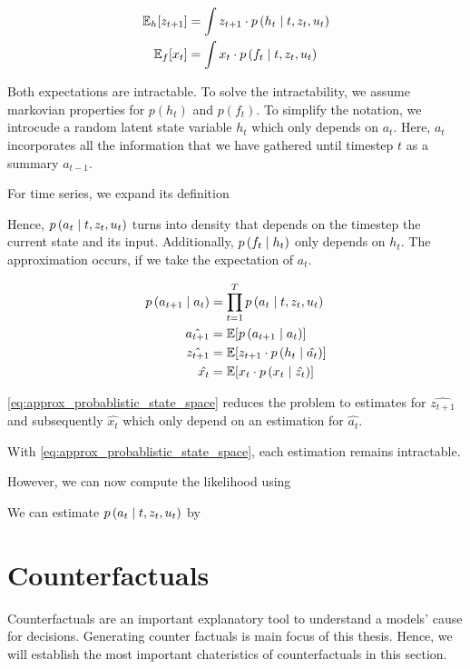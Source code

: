 \documentclass[12pt,a4paper]{report}
\begin{document}
\begin{align}
    \label{eq:probablistic_state_space}
    \mathbb{E}_h[z_{t+1}] & =
    \int z_{t+1} \cdot p\left(h_t \mid t, z_{t}, u_{t}\right) \\
    \mathbb{E}_f[x_{t}]   & =
    \int x_{t} \cdot p\left(f_t \mid t, z_{t}, u_{t}\right) \nonumber
\end{align}

\noindent Both expectations are intractable. To solve the intractability, we assume markovian properties for $p(h_t)$ and $p(f_t)$. To simplify the notation, we introcude a random latent state variable $h_t$ which only depends on $a_t$. Here, $a_t$ incorporates all the information that we have gathered until timestep $t$ as a summary $a_{t-1}$. 

For time series, we expand its definition 

Hence, $p\left(a_t \mid t, z_t, u_t\right)$ turns into density that depends on the timestep the current state and its input. Additionally, $p\left(f_t \mid h_t\right)$ only depends on $h_t$. The approximation occurs, if we take the expectation of $a_t$. 

\begin{align}
    \label{eq:approx_probablistic_state_space}
    p\left(a_{t+1}\mid a_{t}\right) & = \prod_{t=1}^{T} p\left(a_t \mid t, z_{t}, u_{t}\right)\\
    \hat{a_{t+1}} & = \mathbb{E}[p\left(a_{t+1}\mid a_{t}\right)] \nonumber \\
    \hat{z_{t+1}} & = \mathbb{E}[z_{t+1} \cdot p\left(h_{t} \mid \hat{a_t}\right)] \nonumber \\
    \hat{x_{t}} & = \mathbb{E}[x_{t} \cdot p\left(x_{t} \mid \hat{z_{t}}\right)] \nonumber
\end{align}

\noindent\autoref{eq:approx_probablistic_state_space} reduces the problem to estimates for $\hat{z_{t+1}}$ and subsequently $\hat{x_{t}}$ which only depend on an estimation for $\hat{a_t}$. 


With \autoref{eq:approx_probablistic_state_space}, each estimation remains intractable. 


However, we can now compute the likelihood using  



We can estimate $p\left(a_t \mid t, z_{t}, u_{t}\right)$ by  

\section{Counterfactuals}
\label{sec:counterfactuals}
Counterfactuals are an important explanatory tool to understand a models' cause for decisions. Generating counter factuals is main focus of this thesis. Hence, we will establish the most important chateristics of counterfactuals in this section.
\end{document}
